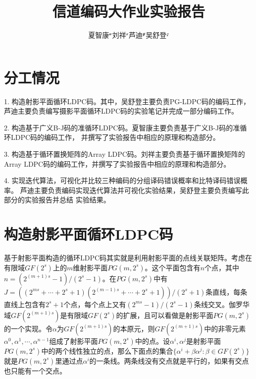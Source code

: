 \documentclass[lang=cn,11pt,a4paper,numbers]{elegantpaper}
\title{信道编码大作业实验报告}
\author{\kaishu\zihao{5} 夏智康$^\mathcal{a}$\quad 刘祥$^\mathcal{x}$\quad 芦迪$^\mathcal{y}$\quad 吴舒登$^\mathcal{z}$}
\institute{清华大学深圳国际研究生院 信息科学与技术学部，深计研19班\\
$\mathcal{a}$ 2019211193\quad $\mathcal{x}$ 2019211165\quad $\mathcal{y}$ 2019211174\quad $\mathcal{z}$ 2019211167}
\date{}
\begin{document}
\maketitle


\section{分工情况}

1. 构造射影平面循环LDPC码。其中，吴舒登主要负责PG-LDPC码的编码工作，
芦迪主要负责编写摄影平面循环LDPC码的实验笔记并完成一部分编码工作。

2. 构造基于广义B-J码的准循环LDPC码。夏智康主要负责基于广义B-J码的准循环LDPC码的编码工作，
并撰写了实验报告中相应的原理和构造部分。

3. 构造基于循环置换矩阵的Array LDPC码。刘祥主要负责基于循环置换矩阵的
Array LDPC码的编码工作，并撰写了实验报告中相应的原理和构造部分。

4. 实现迭代算法，可视化并比较三种编码的分组译码错误概率和比特译码错误概率。
芦迪主要负责编码实现迭代算法并可视化实验结果，吴舒登主要负责编写此部分的实验报告并总结
实验结果。


\section{构造射影平面循环LDPC码}

基于射影平面构造的循环LDPC码其实就是利用射影平面的点线关联矩阵。考虑在有限域$GF(2^s)$上的$m$维射影平面$PG(m,2^s)$。这个平面包含有$n$个点，其中$\displaystyle{n=(2^{(m+1)s}-1)/(2^s-1)}$。在$PG(m,2^s)$中有$\displaystyle{J=((2^{ms}+\cdots+2^s+1)(2^{(m-1)s}+\cdots+2^s+1))/(2^s+1)}$条直线，每条直线上包含有$2^s+1$个点，每个点上又有$\displaystyle{(2^{ms}-1)/(2^s-1)}$条线交叉。伽罗华域$GF(2^{(m+1)s})$是有限域$GF(2^s)$的扩展，且可以看做是射影平面$PG(m,2^s)$的一个实现。令$\alpha$为$GF(2^{(m+1)s})$的本原元，则$GF(2^{(m+1)s})$中的非零元素$\alpha^0,\alpha^1,\cdots,\alpha^{n-1}$组成了射影平面$PG(m,2^s)$中的点。设$\alpha^i,\alpha^j$是射影平面$PG(m,2^s)$中的两个线性独立的点，那么下面点的集合$\{\alpha^i+\beta\alpha^j:\beta\in GF(2^s)\}$就是$PG(m,2^s)$里通过点$\alpha^i$的一条线。两条线没有交点就是平行的，如果有交点也只能有一个交点。
\end{document}
